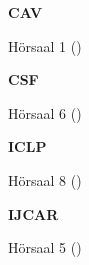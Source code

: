 \documentclass{article}
\begin{document}

\vspace{1cm}

\begin{center}
\begin{vsltext}{2.5cm}{3.5cm}

    \textbf{CAV}\\

\end{vsltext}

\begin{vsltext}{1.5cm}{2cm}

    Hörsaal 1 (\AreaC)

\end{vsltext}

    \vspace{1cm}

\begin{vsltext}{2.5cm}{3.5cm}
    
    \textbf{CSF}\\

\end{vsltext}
\begin{vsltext}{1.5cm}{2cm}

    Hörsaal 6 (\AreaA)

\end{vsltext}

    \vspace{1cm}


\begin{vsltext}{2.5cm}{3.5cm}
    
    \textbf{ICLP}\\

\end{vsltext}
\begin{vsltext}{1.5cm}{2cm}

    Hörsaal 8 (\AreaB)

\end{vsltext}

    \vspace{1cm}

\begin{vsltext}{2.5cm}{3.5cm}

    \textbf{IJCAR}\\

\end{vsltext}
\begin{vsltext}{1.5cm}{2cm}

    Hörsaal 5 (\AreaA)

\end{vsltext}

\end{center}
\end{document}
